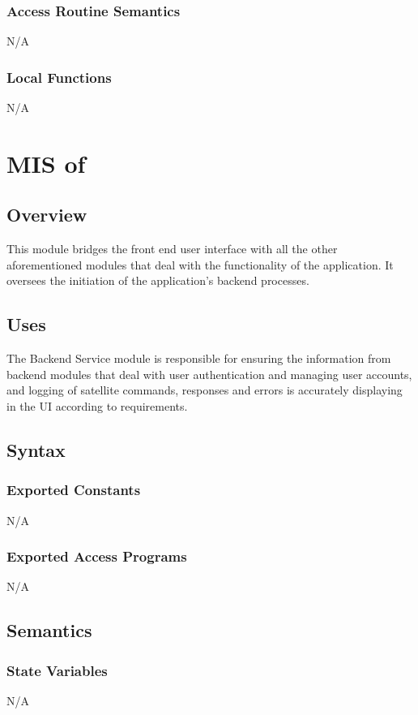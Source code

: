 \documentclass[12pt, titlepage]{article}
\begin{document}
\subsubsection{Access Routine Semantics}

N/A

\subsubsection{Local Functions}

N/A

\section{MIS of } \label{Module} 
\subsection{Overview}
This module bridges the front end user interface with all the other aforementioned modules that deal with the functionality of the application. It oversees the initiation of the application's backend processes.

\subsection{Uses}

The Backend Service module is responsible for ensuring the information from backend modules that deal with user authentication and managing user accounts, and  logging of satellite commands, responses and errors is accurately displaying in the UI according to requirements. 

\subsection{Syntax}

\subsubsection{Exported Constants}
N/A
\subsubsection{Exported Access Programs}
N/A
\subsection{Semantics}

\subsubsection{State Variables}
N/A
\end{document}
